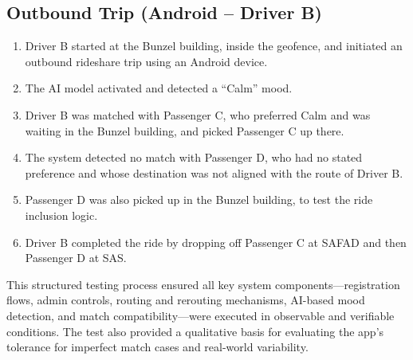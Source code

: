 \subsection[Outbound Trip (Android -- Driver B)]{Outbound Trip (Android -- Driver B)}
\vspace{1em}
    \begin{enumerate}
        \item Driver B started at the Bunzel building, inside the geofence, and initiated an outbound rideshare trip using an Android device.
        \item The AI model activated and detected a ``Calm'' mood.
        \item Driver B was matched with Passenger C, who preferred Calm and was waiting in the Bunzel building, and picked Passenger C up there.
        \item The system detected no match with Passenger D, who had no stated preference and whose destination was not aligned with the route of Driver B.
        \item Passenger D was also picked up in the Bunzel building, to test the ride inclusion logic.
        \item Driver B completed the ride by dropping off Passenger C at SAFAD and then Passenger D at SAS.
    \end{enumerate}

\indent This structured testing process ensured all key system components—registration flows, admin controls, routing and rerouting mechanisms, AI-based mood detection, and match compatibility—were executed in observable and verifiable conditions. The test also provided a qualitative basis for evaluating the app’s tolerance for imperfect match cases and real-world variability.


